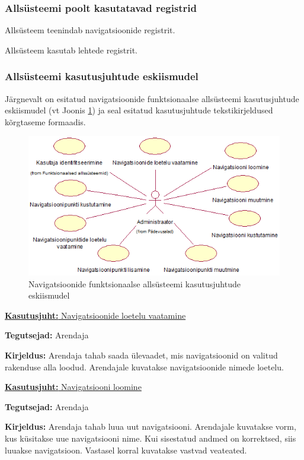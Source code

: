 \documentclass[a4paper,12pt]{article} %
\begin{document}
\subsubsection{Allsüsteemi poolt kasutatavad registrid}
Allsüsteem teenindab navigatsioonide registrit.\par
Allsüsteem kasutab lehtede registrit.
\subsubsection{Allsüsteemi kasutusjuhtude eskiismudel}
Järgnevalt on esitatud navigatsioonide funktsionaalse allsüsteemi kasutusjuhtude eskiismudel (vt Joonis \ref{fig_navigatsioonide_funktsionaalse_allsüsteemi_kasutusjuhtude_eskiismudel}) ja seal esitatud kasutusjuhtude tekstikirjeldused kõrgtaseme formaadis.
\begin{figure}[H]
\centering
\includegraphics[width=\textwidth]{./diagrams/navigations-subsystem-use-case-digram.png}
\caption{Navigatsioonide funktsionaalse allsüsteemi kasutusjuhtude eskiismudel}
\label{fig_navigatsioonide_funktsionaalse_allsüsteemi_kasutusjuhtude_eskiismudel}
\end{figure}

\underline{\textbf{Kasutusjuht:} Navigatsioonide loetelu vaatamine}
\par
\textbf{Tegutsejad:} Arendaja
\par
\textbf{Kirjeldus:} Arendaja tahab saada ülevaadet, mis navigatsioonid on valitud rakenduse alla loodud. Arendajale kuvatakse navigatsioonide nimede loetelu.
\par

\underline{\textbf{Kasutusjuht:} Navigatsiooni loomine}
\par
\textbf{Tegutsejad:} Arendaja
\par
\textbf{Kirjeldus:} Arendaja tahab luua uut navigatsiooni. Arendajale kuvatakse vorm, kus küsitakse uue navigatsiooni nime. Kui sisestatud andmed on korrektsed, siis luuakse navigatsioon. Vastasel korral kuvatakse vastvad veateated.
\par
\end{document}
